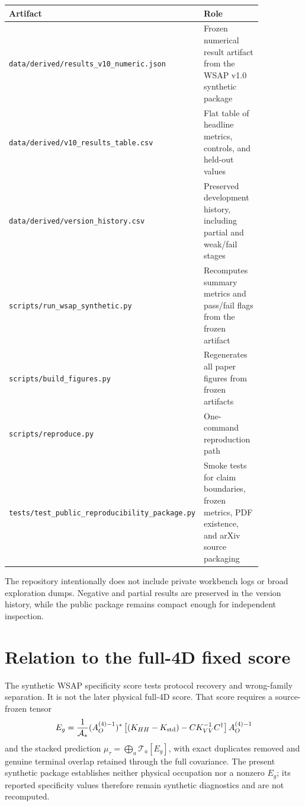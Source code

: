 \documentclass[12pt]{article}
\begin{document}
\begin{center}
\small
\begin{tabular}{L{0.36\linewidth}L{0.49\linewidth}}
\toprule
Artifact & Role\\
\midrule
\texttt{data/derived/}\newline\texttt{results\_v10\_numeric.json} & Frozen numerical result
artifact from the WSAP v1.0 synthetic package\\
\texttt{data/derived/}\newline\texttt{v10\_results\_table.csv} & Flat table of headline
metrics, controls, and held-out values\\
\texttt{data/derived/}\newline\texttt{version\_history.csv} & Preserved development history,
including partial and weak/fail stages\\
\texttt{scripts/}\newline\texttt{run\_wsap\_synthetic.py} & Recomputes summary metrics and
pass/fail flags from the frozen artifact\\
\texttt{scripts/}\newline\texttt{build\_figures.py} & Regenerates all paper figures from
frozen artifacts\\
\texttt{scripts/}\newline\texttt{reproduce.py} & One-command reproduction path\\
\texttt{tests/}\newline\texttt{test\_public\_}\newline\texttt{reproducibility\_package.py} & Smoke tests for
claim boundaries, frozen metrics, PDF existence, and arXiv source packaging\\
\bottomrule
\end{tabular}
\end{center}

The repository intentionally does not include private workbench logs or broad
exploration dumps.  Negative and partial results are preserved in the version
history, while the public package remains compact enough for independent
inspection.

\section{Relation to the full-4D fixed score}

The synthetic WSAP specificity score tests protocol recovery and wrong-family
separation.  It is not the later physical full-4D score.  That score requires
a source-frozen tensor
\[
 E_g=\frac{1}{\mathcal A_*}(A_O^{(4)-1})^*
 \left[(K_{HH}-K_{\rm std})-CK_{VV}^{-1}C^\dagger\right]
 A_O^{(4)-1}
\]
and the stacked prediction $\mu_\tau=\bigoplus_a\mathcal T_a[E_g]$, with exact
duplicates removed and genuine terminal overlap retained through the full
covariance.  The present synthetic package establishes neither physical
occupation nor a nonzero $E_g$; its reported specificity values therefore
remain synthetic diagnostics and are not recomputed.
\end{document}
